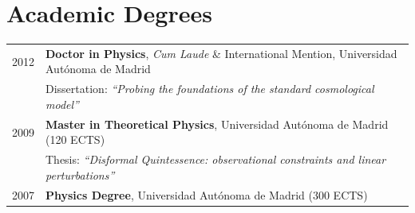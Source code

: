 \documentclass[11pt,a4paper]{article}
\begin{document}
\section*{Academic Degrees}
\vspace{-0.3cm}
\begin{longtable}{c p{15.5 cm}}
2012 & \textbf{Doctor in Physics}, \emph{Cum Laude} \& International Mention, Universidad Aut\'onoma de Madrid
\\ &
 Dissertation: \emph{``Probing the foundations of the standard cosmological model''} 
\\[3pt]
2009 & \textbf{Master in Theoretical Physics}, Universidad Aut\'onoma de Madrid (120 ECTS) 
\\ &
 Thesis: \emph{``Disformal Quintessence: observational constraints and linear perturbations''} 
\\[3pt]
2007 & \textbf{Physics Degree}, Universidad Aut\'onoma de Madrid (300 ECTS)
\end{longtable}



\end{document}

